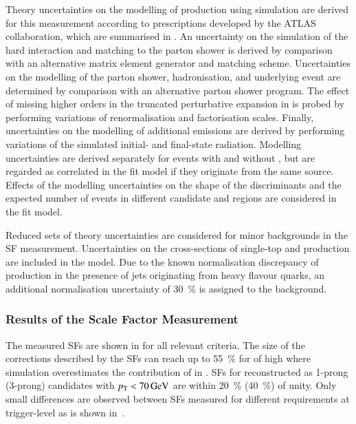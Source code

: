 Theory uncertainties on the modelling of \ttbar production using simulation are
derived for this measurement according to prescriptions developed by the ATLAS
collaboration, which are summarised in . An
uncertainty on the simulation of the hard interaction and matching to the parton
shower is derived by comparison with an alternative matrix element generator and
matching scheme. Uncertainties on the modelling of the parton shower,
hadronisation, and underlying event are determined by comparison with an
alternative parton shower program. The effect of missing higher orders in the
truncated perturbative expansion in \alphas is probed by performing variations
of renormalisation and factorisation scales. Finally, uncertainties on the
modelling of additional emissions are derived by performing variations of the
simulated initial- and final-state radiation. Modelling uncertainties are
derived separately for \ttbar events with and without \faketauhadvis, but are
regarded as correlated in the fit model if they originate from the same
source. Effects of the \ttbar modelling uncertainties on the shape of the \mTW
discriminants and the expected number of events in different \tauhadvis
candidate \Ntracks and \pT regions are considered in the fit model.

Reduced sets of theory uncertainties are considered for minor backgrounds in the
SF measurement. Uncertainties on the cross-sections of single-top and \Vjets
production are included in the model. Due to the known normalisation discrepancy
of \Vjets production in the presence of jets originating from heavy flavour
quarks, an additional normalisation uncertainty of \SI{30}{\percent} is assigned
to the \Vjets background.


\subsubsection{Results of the Scale Factor Measurement}

The measured \faketauhadvis SFs are shown in  for
all relevant \tauid criteria. The size of the corrections described by the SFs
can reach up to \SI{55}{\percent} for \faketauhadvis of high \pT where
simulation overestimates the contribution of \faketauhadvis in \ttbar. SFs for
\faketauhadvis reconstructed as 1-prong (3-prong) candidates with
$\pT < \SI{70}{\GeV}$ are within \SI{20}{\percent} (\SI{40}{\percent}) of
unity. Only small differences are observed between SFs measured for different
\tauid requirements at trigger-level as is shown
in~.

